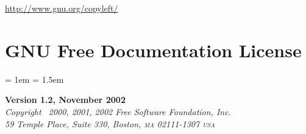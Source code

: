 
\def\gpl     {GNU General Public License\xspace}
\def\fdl     {GNU Free Documentation License\xspace}
\def\ascii   {Ascii\xspace}
\def\texinfo {Texinfo\xspace}
\def\PS      {PostScript\xspace}
\urldef \webCopyLeft \url {http://www.gnu.org/copyleft/}

\makeatletter
\def \section {%
    \@startsection{section}{1}{\z@}%
    {0.4ex}{0.4ex}%
    {\normalfont \footnotesize \bfseries \raggedright}}
\makeatother

\chapter[{\fdl}]{\Large\fdl}\label{fdl}

\bgroup
  \scriptsize 
  \frenchspacing
  \parindent = 1em
  \columnsep = 1.5em
  \begin{center}
   \textbf{Version 1.2, November 2002}\\
   \textit{Copyright \textcopyright\ 2000, 2001, 2002 Free Software Foundation, Inc.}\\
   \textit{59 Temple Place, Suite 330, Boston, \textsc{ma} 02111-1307 \textsc{usa}}
  \end{center}


